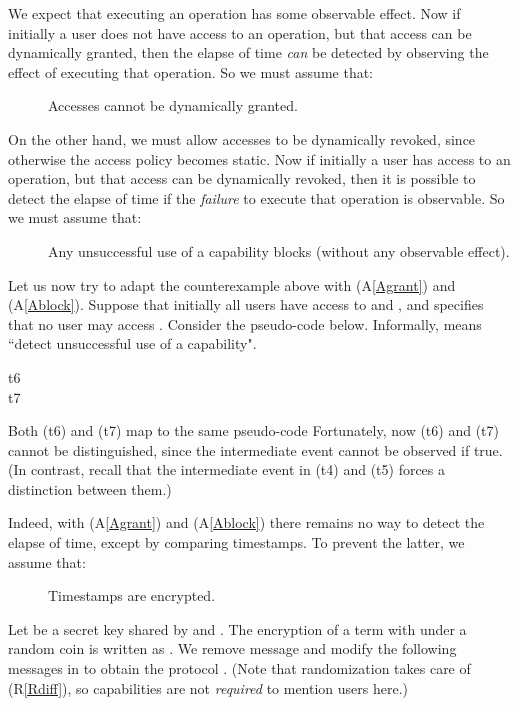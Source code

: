 \documentclass[10pt]{article}
\makeatletter
\newcounter{Cassums}
\newcommand{\A}{\addtocounter{Cassums}{1}A\arabic{Cassums}\gdef\@currentlabel{\arabic{Cassums}}}
\makeatother
\begin{document}
We expect that executing an operation has some observable effect. Now if initially a user does not have access to an operation, but that access can be dynamically granted, then the elapse of time \emph{can} be detected by observing the effect of executing that operation. So we must assume that:
\begin{description}
\item[\A]\label{Agrant} Accesses cannot be dynamically granted.
\end{description}
On the other hand, we must allow accesses to be dynamically revoked, since otherwise the access policy becomes static. Now if initially a user has access to an operation, but that access can be dynamically revoked, then it is possible to detect the elapse of time if the \emph{failure} to execute that operation is observable. So we must assume that:
\begin{description}
\item[\A]\label{Ablock} Any unsuccessful use of a capability blocks (without any observable effect).
\end{description}
Let us now try to adapt the counterexample above with (A\ref{Agrant}) and (A\ref{Ablock}). Suppose that initially all users have access to  and , and  specifies that no user may access . Consider the  pseudo-code below. Informally,  means ``detect unsuccessful use of a capability". 
\begin{description}
\item[t6] 




\item[t7] 


\end{description}
Both (t6) and (t7) map to the same  pseudo-code 
Fortunately, now (t6) and (t7) cannot be distinguished, since the intermediate  event cannot be observed if true. (In contrast, recall that the intermediate  event in (t4) and (t5) forces a distinction between them.)

Indeed, with (A\ref{Agrant}) and (A\ref{Ablock}) there remains no way to detect the elapse of time, except by comparing timestamps. To prevent the latter, we
 assume that:
\begin{description}
\item[\A]\label{Aclock} Timestamps are encrypted.\end{description}
Let  be a secret key shared by  and . The encryption of a term  with  under a random coin  is written as . We remove  message  and modify the following messages in  to obtain the protocol . (Note that randomization takes care of (R\ref{Rdiff}), so capabilities are not \emph{required} to mention users here.) 
\end{document}
